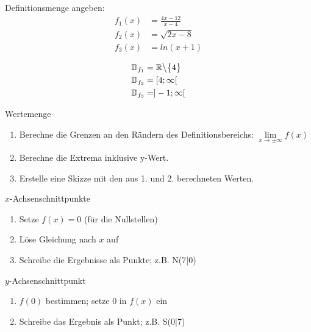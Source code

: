 \begin{frage}Definitionsmenge angeben:
	\begin{align*}
	     f_1(x)&=\frac{4x-12}{x-4} \\
		 f_2(x)&=\sqrt{2x-8}\\
		 f_3(x)&=ln(x+1)
	\end{align*}\end{frage}
\begin{antwort}\begin{align*}
	   	  \mathbb{D}_{f_1}&=\mathbb{R}\big\backslash\big\{4\big\} \\
		  \mathbb{D}_{f_2}&=[4;\infty[ \\
		  \mathbb{D}_{f_3}&=]-1;\infty[ 
	\end{align*}\end{antwort}
\begin{frage}Wertemenge\end{frage}
\begin{antwort}\begin{enumerate}
		\item Berechne die Grenzen an den Rändern des Definitionsbereichs: $\lim\limits_{x \rightarrow\pm\infty}{f(x)}$
		\item Berechne die Extrema inklusive y-Wert.
		\item Erstelle eine Skizze mit den aus 1. und 2. berechneten Werten.
	\end{enumerate}\end{antwort}
\begin{frage}$x$-Achsenschnittpunkte\end{frage}
\begin{antwort}\begin{enumerate}
		\item Setze $f(x)=0$ (für die Nullstellen)
		\item Löse Gleichung nach $x$ auf
		\item Schreibe die Ergebnisse als Punkte; z.B. N(7|0)
	\end{enumerate}\end{antwort}
\begin{frage}$y$-Achsenschnittpunkt\end{frage}
\begin{antwort}\begin{enumerate}
		\item $f(0)$ bestimmen; setze $0$ in $f(x)$ ein
		\item Schreibe das Ergebnis als Punkt; z.B. S(0|7)
	\end{enumerate}\end{antwort}
